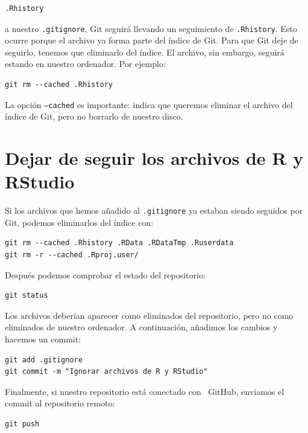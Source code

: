 \documentclass[11pt,a4paper]{article}
\newcommand{\GitHub}{\faIcon{github}~\!GitHub}
\theoremstyle{exercise}
\begin{document}
\begin{lstlisting}[style=mdstyle]
.Rhistory
\end{lstlisting}

\noindent a nuestro \texttt{.gitignore}, Git seguirá llevando un seguimiento de \texttt{.Rhistory}. Esto ocurre porque el archivo ya forma parte del índice de Git. Para que Git deje de seguirlo, tenemos que eliminarlo del índice. El archivo, sin embargo, seguirá estando en nuestro ordenador. Por ejemplo:

\begin{lstlisting}[style=mdstyle]
git rm --cached .Rhistory
\end{lstlisting}

La opción \texttt{--cached} es importante: indica que queremos eliminar el archivo del índice de Git, pero no borrarlo de nuestro disco.



\section{Dejar de seguir los archivos de R y RStudio}

Si los archivos que hemos añadido al \texttt{.gitignore} ya estaban siendo seguidos por Git, podemos eliminarlos del índice con:

\begin{lstlisting}[style=mdstyle]
git rm --cached .Rhistory .RData .RDataTmp .Ruserdata
git rm -r --cached .Rproj.user/
\end{lstlisting}

Después podemos comprobar el estado del repositorio:

\begin{lstlisting}[style=mdstyle]
git status
\end{lstlisting}

\noindent Los archivos deberían aparecer como eliminados del repositorio, pero no como eliminados de nuestro ordenador. A continuación, añadimos los cambios y hacemos un commit:

\begin{lstlisting}[style=mdstyle]
git add .gitignore
git commit -m "Ignorar archivos de R y RStudio"
\end{lstlisting}

\noindent Finalmente, si nuestro repositorio está conectado con \GitHub, enviamos el commit al repositorio remoto:

\begin{lstlisting}[style=mdstyle]
git push
\end{lstlisting}
\end{document}
